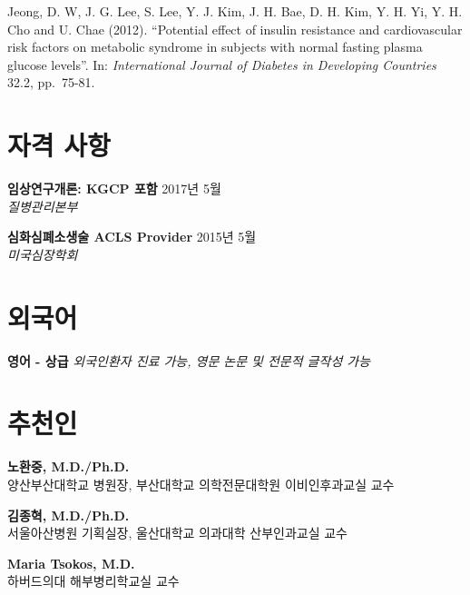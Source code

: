 \documentclass[12pt,]{article}
\begin{document}
Jeong, D. W, J. G. Lee, S. Lee, Y. J. Kim, J. H. Bae, D. H. Kim, Y. H.
Yi, Y. H. Cho and U. Chae (2012). ``Potential effect of insulin
resistance and cardiovascular risk factors on metabolic syndrome in
subjects with normal fasting plasma glucose levels''. In:
\emph{International Journal of Diabetes in Developing Countries} 32.2,
pp.~75-81.

\hypertarget{-}{%
\section{자격 사항}\label{-}}

\textbf{임상연구개론: KGCP 포함} \hfill 2017년 5월\\
\emph{질병관리본부}

\textbf{심화심폐소생술 ACLS Provider} \hfill 2015년 5월\\
\emph{미국심장학회}

\section{외국어}

\textbf{영어 - 상급} \emph{외국인환자 진료 가능, 영문 논문 및 전문적
글작성 가능}

\section{추천인}

\textbf{노환중, M.D./Ph.D.}\\
양산부산대학교 병원장, 부산대학교 의학전문대학원 이비인후과교실 교수

\textbf{김종혁, M.D./Ph.D.}\\
서울아산병원 기획실장, 울산대학교 의과대학 산부인과교실 교수

\textbf{Maria Tsokos, M.D.}\\
하버드의대 해부병리학교실 교수
\end{document}
